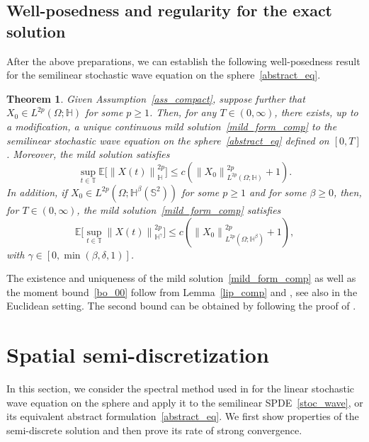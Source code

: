 \documentclass[a4paper]{amsart}
\newtheorem{thm}{Theorem}
\theoremstyle{remark}
\theoremstyle{definition}
\newcommand{\HH}{\mathbb{H}}
\newcommand{\IT}{\mathbb{T}}
\begin{document}
\subsection{Well-posedness and regularity for the exact solution}
After the above preparations, we can establish the following well-posedness result 
for the semilinear stochastic wave equation on the sphere~\eqref{abstract_eq}. 
\begin{thm}
\label{wp_thm}
Given Assumption~\ref{ass_compact}, suppose further that $X_0\in L^{2p}\left(\Omega; \HH\right)$ for some $p\ge 1$. Then, for any $T\in(0,\infty)$, there exists, up to a modification, a unique continuous mild solution~\eqref{mild_form_comp} to the semilinear stochastic wave equation on the sphere~\eqref{abstract_eq} defined on $[0,T]$. Moreover, the mild solution satisfies 
\begin{equation}
\label{bo_00}
\sup_{t\in\IT}\mathbb{E}\bigg[\left\|X(t)\right\|^{2p}_{\HH}\bigg]\le c\left(\left\|X_0\right\|_{L^{2p}(\Omega;\HH)}^{2p}+1\right).
\end{equation}
In addition, if $X_0\in L^{2p}\left(\Omega; {\HH}^\beta(\mathbb{S}^2)\right)$ for some $p\ge 1$ and for some $\beta\ge 0$, then, for $T\in(0,\infty)$, the mild solution~\eqref{mild_form_comp} satisfies
\begin{equation}
\label{bo_01}
\mathbb{E}\bigg[\sup_{t\in\IT}\left\|X(t)\right\|^{2p}_{{\HH}^\gamma}\bigg]\le c\left(\left\|X_0\right\|_{L^{2p}(\Omega;{\HH}^\beta)}^{2p}+1\right),
\end{equation}
with $\gamma \in [0,\min(\beta,\delta,1)]$.
\end{thm}
The existence and uniqueness of the mild solution~\eqref{mild_form_comp} as well as the moment bound~\eqref{bo_00} follow from Lemma~\ref{lip_comp} and \cite[Theorem~7.2]{MR3236753}, see also \cite{MR3484400,MR3353942} in the Euclidean setting. The second bound can be obtained by following the proof of \cite[Proposition~3.1]{MR3353942}.

\section{Spatial semi-discretization}\label{sec-space}
In this section, we consider the spectral method used in \cite{MR4462619} for the linear stochastic wave equation on the sphere and apply it to the semilinear SPDE~\eqref{stoc_wave}, or its equivalent abstract formulation~\eqref{abstract_eq}. We first show properties of the semi-discrete solution and then prove its rate of strong convergence. 
\end{document}

